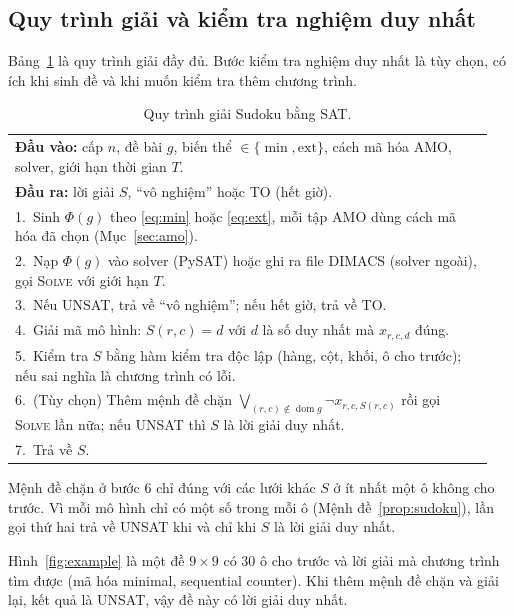 \documentclass[a4paper,fleqn]{cas-sc}
\newcommand{\dom}{\operatorname{dom}}
\begin{document}
\subsection{Quy trình giải và kiểm tra nghiệm duy nhất}\label{sec:procedure}

Bảng~\ref{tab:procedure} là quy trình giải đầy đủ. Bước kiểm tra nghiệm duy nhất là tùy chọn, có ích khi sinh đề và khi muốn kiểm tra thêm chương trình.

\begin{table}[t]
\caption{Quy trình giải Sudoku bằng SAT.}
\label{tab:procedure}
\centering\small
\begin{tabular}{p{0.95\linewidth}}
\toprule
\textbf{Đầu vào:} cấp $n$, đề bài $g$, biến thể $\in\{\min,\mathrm{ext}\}$, cách mã hóa AMO, solver, giới hạn thời gian $T$.\\
\textbf{Đầu ra:} lời giải $S$, ``vô nghiệm'' hoặc TO (hết giờ).\\
\midrule
1.\ Sinh $\Phi(g)$ theo \eqref{eq:min} hoặc \eqref{eq:ext}, mỗi tập AMO dùng cách mã hóa đã chọn (Mục~\ref{sec:amo}).\\
2.\ Nạp $\Phi(g)$ vào solver (PySAT) hoặc ghi ra file DIMACS (solver ngoài), gọi \textsc{Solve} với giới hạn $T$.\\
3.\ Nếu UNSAT, trả về ``vô nghiệm''; nếu hết giờ, trả về TO.\\
4.\ Giải mã mô hình: $S(r,c)=d$ với $d$ là số duy nhất mà $x_{r,c,d}$ đúng.\\
5.\ Kiểm tra $S$ bằng hàm kiểm tra độc lập (hàng, cột, khối, ô cho trước); nếu sai nghĩa là chương trình có lỗi.\\
6.\ (Tùy chọn) Thêm mệnh đề chặn $\bigvee_{(r,c)\notin\dom g}\neg x_{r,c,S(r,c)}$ rồi gọi \textsc{Solve} lần nữa; nếu UNSAT thì $S$ là lời giải duy nhất.\\
7.\ Trả về $S$.\\
\bottomrule
\end{tabular}
\end{table}

Mệnh đề chặn ở bước 6 chỉ đúng với các lưới khác $S$ ở ít nhất một ô không cho trước. Vì mỗi mô hình chỉ có một số trong mỗi ô (Mệnh đề~\ref{prop:sudoku}), lần gọi thứ hai trả về UNSAT khi và chỉ khi $S$ là lời giải duy nhất.

Hình~\ref{fig:example} là một đề $9\times9$ có 30 ô cho trước và lời giải mà chương trình tìm được (mã hóa minimal, sequential counter). Khi thêm mệnh đề chặn và giải lại, kết quả là UNSAT, vậy đề này có lời giải duy nhất.
\end{document}
